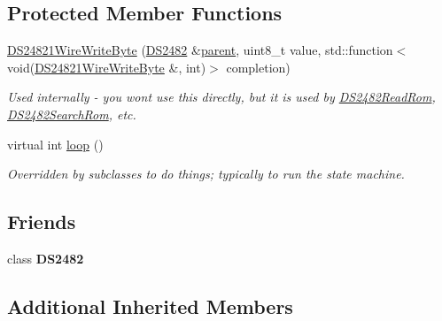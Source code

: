 \subsection*{Protected Member Functions}
\begin{DoxyCompactItemize}
\item 
\mbox{\label{class_d_s24821_wire_write_byte_ac4662898e8aaf037272157d9eed86434}} 
\mbox{\hyperlink{class_d_s24821_wire_write_byte_ac4662898e8aaf037272157d9eed86434}{D\+S24821\+Wire\+Write\+Byte}} (\mbox{\hyperlink{class_d_s2482}{D\+S2482}} \&\mbox{\hyperlink{class_d_s2482_command_a54a41fb8a610ef2077f5e5377771aaf3}{parent}}, uint8\+\_\+t value, std\+::function$<$ void(\mbox{\hyperlink{class_d_s24821_wire_write_byte}{D\+S24821\+Wire\+Write\+Byte}} \&, int)$>$ completion)
\begin{DoxyCompactList}\small\item\em Used internally -\/ you won\textquotesingle{}t use this directly, but it is used by \mbox{\hyperlink{class_d_s2482_read_rom}{D\+S2482\+Read\+Rom}}, \mbox{\hyperlink{class_d_s2482_search_rom}{D\+S2482\+Search\+Rom}}, etc. \end{DoxyCompactList}\item 
\mbox{\label{class_d_s24821_wire_write_byte_a5a23b89bb74a638af353ef44bf75ce37}} 
virtual int \mbox{\hyperlink{class_d_s24821_wire_write_byte_a5a23b89bb74a638af353ef44bf75ce37}{loop}} ()
\begin{DoxyCompactList}\small\item\em Overridden by subclasses to do things; typically to run the state machine. \end{DoxyCompactList}\end{DoxyCompactItemize}
\subsection*{Friends}
\begin{DoxyCompactItemize}
\item 
\mbox{\label{class_d_s24821_wire_write_byte_afeaf69274324e8dbeebede05c02d9c18}} 
class {\bfseries D\+S2482}
\end{DoxyCompactItemize}
\subsection*{Additional Inherited Members}


